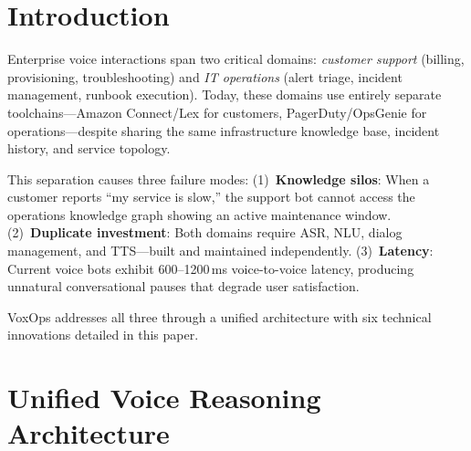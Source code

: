 \documentclass[conference,10pt]{IEEEtran}
\begin{document}
\section{Introduction}
\label{sec:intro}

Enterprise voice interactions span two critical domains: \emph{customer support} (billing, provisioning, troubleshooting) and \emph{IT operations} (alert triage, incident management, runbook execution). Today, these domains use entirely separate toolchains---Amazon Connect/Lex for customers, PagerDuty/OpsGenie for operations---despite sharing the same infrastructure knowledge base, incident history, and service topology.

This separation causes three failure modes: (1)~\textbf{Knowledge silos}: When a customer reports ``my service is slow,'' the support bot cannot access the operations knowledge graph showing an active maintenance window. (2)~\textbf{Duplicate investment}: Both domains require ASR, NLU, dialog management, and TTS---built and maintained independently. (3)~\textbf{Latency}: Current voice bots exhibit 600--1200\,ms voice-to-voice latency, producing unnatural conversational pauses that degrade user satisfaction.

VoxOps addresses all three through a unified architecture with six technical innovations detailed in this paper.

\section{Unified Voice Reasoning Architecture}
\label{sec:arch}
\end{document}
